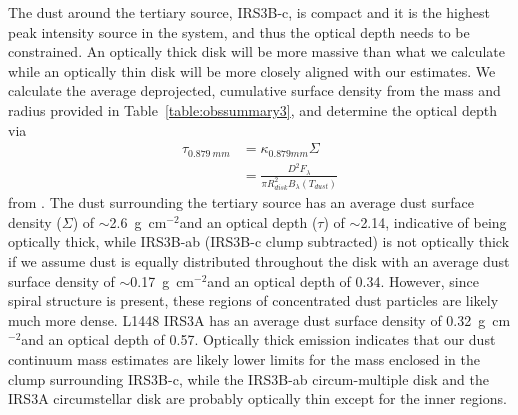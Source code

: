 \documentclass[twocolumn, 12pt,trackchanges]{aastex63}
\newcommand{\ab}{$\sim$}
\begin{document}
The dust around the tertiary source, IRS3B-c, is compact and it is the highest peak intensity source in the system, and thus the optical depth needs to be constrained. An optically thick disk will be more massive than what we calculate while an optically thin disk will be more closely aligned with our estimates. We calculate the average deprojected, cumulative surface density from the mass and radius provided in Table~\ref{table:obssummary3}, and determine the optical depth via 
\begin{align*}
\tau_{0.879~mm} &= \kappa_{0.879 mm}\Sigma \\
 &=\frac{D^2 F_{\lambda}}{\pi R_{disk}^{2}B_{\lambda}(T_{dust})}
\end{align*}
from \citep{2016Natur.538..483T}. The dust surrounding the tertiary source has an average dust surface density ($\Sigma$) of \ab2.6~g~cm$^{-2}$\space and an optical depth ($\tau$) of \ab2.14, indicative of being optically thick, while IRS3B-ab (IRS3B-c clump subtracted) is not optically thick if we assume dust is equally distributed throughout the disk with an average dust surface density of \ab0.17~g~cm$^{-2}$\space and an optical depth of 0.34. However, since spiral structure is present, these regions of concentrated dust particles are likely much more dense. L1448 IRS3A has an average dust surface density of 0.32~g~cm$^{-2}$\space and an optical depth of 0.57. Optically thick emission indicates that our dust continuum mass estimates are likely lower limits for the mass enclosed in the clump surrounding IRS3B-c, while the IRS3B-ab circum-multiple disk and the IRS3A circumstellar disk are probably optically thin except for the inner regions. 
\end{document}

